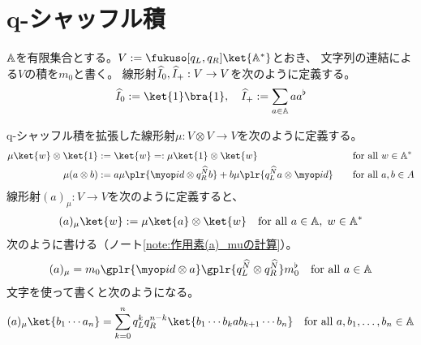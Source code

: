 {\section{q-シャッフル積}\label{s1:q-シャッフル積} %
	$\mathbb{A}$を有限集合とする。$V:=\fukuso[q_L,q_R]\ket{\setA^*}$とおき、
	文字列の連結による$V$の積を$m_0$と書く。
	線形射${\widehat{I}}_0,{\widehat{I}}_+:V\to V$を次のように定義する。
	\begin{equation*}\begin{split}
		\Ihat_0 := \ket{1}\bra{1},\quad \Ihat_+ := \sum_{a\in\setA} aa^\flat
	\end{split}\end{equation*}

	q-シャッフル積を拡張した線形射$\mu:V\otimes V\to V$を次のように定義する。
	\begin{alignat*}{2}
		\mu\ket{w}\otimes\ket{1} &:= \ket{w}
		=: \mu\ket{1}\otimes\ket{w} &&\quad\text{for all } w\in\setA^* \\
		\mu(a\otimes b) &:= a\mu\plr{\id\otimes q_R^{\Nhat}b}
		+ b\mu\plr{q_L^{\Nhat}a\otimes\id} &&\quad\text{for all } a,b\in A
	\end{alignat*}
	線形射$(a)_\mu:V\to V$を次のように定義すると、
	\begin{equation*}\begin{split}
		(a)_\mu\ket{w} := \mu\ket{a}\otimes\ket{w} 
		\quad\text{for all } a\in\setA,\; w\in\setA^*
	\end{split}\end{equation*}
	次のように書ける（ノート\ref{note:作用素(a)_muの計算}）。
	\begin{equation*}\begin{split}
		(a)_\mu = m_0\gplr{\id\otimes a}\gplr{q_L^\Nhat\otimes q_R^\Nhat}
			m_0^\flat \quad\text{for all } a\in\setA
	\end{split}\end{equation*}
	文字を使って書くと次のようになる。
	\begin{equation*}\begin{split}
		(a)_\mu\ket{b_1\cdots a_n} = \sum_{k=0}^n
		q_L^kq_R^{n-k}\ket{b_1\cdots b_kab_{k+1}\cdots b_n}
		\quad\text{for all } a,b_1,\dots,b_n\in\setA
	\end{split}\end{equation*}

}
